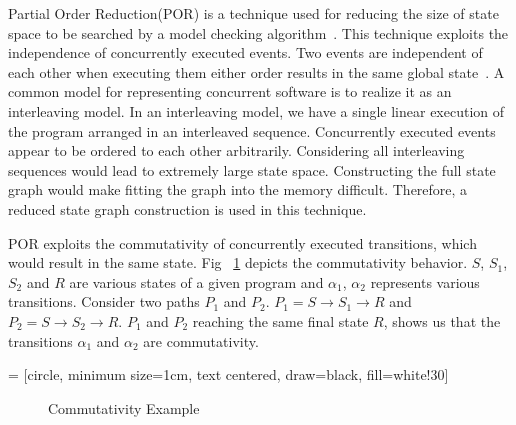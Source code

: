 Partial Order Reduction(POR) is a technique used for reducing the size of state space to be searched by a model checking algorithm~\citep{por10yrs}. 
This technique exploits the independence of concurrently executed events. 
Two events are independent of each other when executing them either order results in the same global state~\citep{model_check}. 
A common model for representing concurrent software is to realize it as an interleaving model. 
In an interleaving model, we have a single linear execution of the program arranged in an interleaved sequence. 
Concurrently executed events appear to be ordered to each other arbitrarily. 
Considering all interleaving sequences would lead to extremely large state space. 
Constructing the full state graph would make fitting the graph into the memory difficult. 
Therefore, a reduced state graph construction is used in this technique. 
 
POR exploits the commutativity of concurrently executed transitions, which would result in the same state. 
Fig ~\ref{commutativity_example} depicts the commutativity behavior. 
$S$, $S_1$, $S_2$ and $R$ are various states of a given program and $\alpha_1$, $\alpha_2$ represents various transitions. 
Consider two paths $P_1$ and $P_2$. 
$P_1 = S \rightarrow S_1 \rightarrow  R$ and $P_2 = S \rightarrow S_2 \rightarrow  R$. 
$P_1$ and $P_2$ reaching the same final state $R$, shows us that the transitions $\alpha_1$ and $\alpha_2$ are commutativity.  





 = [circle, minimum size=1cm, text centered, draw=black, fill=white!30]

\begin{figure}[h]
\centering
{}
\caption{Commutativity Example}
\label{commutativity_example}
\end{figure}

